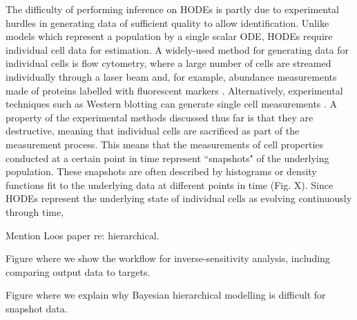 \documentclass[10pt,letterpaper]{article}
\begin{document}
The difficulty of performing inference on HODEs is partly due to experimental hurdles in generating data of sufficient quality to allow identification. Unlike models which represent a population by a single scalar ODE, HODEs require individual cell data for estimation. A widely-used method for generating data for individual cells is flow cytometry, where a large number of cells are streamed individually through a laser beam and, for example, abundance measurements made of proteins labelled with fluorescent markers \cite{telford2012flow}. Alternatively, experimental techniques such as Western blotting can generate single cell measurements \cite{hughes2014single}. A property of the experimental methods discussed thus far is that they are destructive, meaning that individual cells are sacrificed as part of the measurement process. This means that the measurements of cell properties conducted at a certain point in time represent ``snapshots" of the underlying population. These snapshots are often described by histograms \cite{dixit2018maximum} or density functions \cite{waldherr2018estimation} fit to the underlying data at different points in time (Fig. X). Since HODEs represent the underlying state of individual cells as evolving continuously through time, 


Mention Loos paper re: hierarchical.



Figure where we show the workflow for inverse-sensitivity analysis, including comparing output data to targets.

Figure where we explain why Bayesian hierarchical modelling is difficult for snapshot data.





\linenumbers
\end{document}
